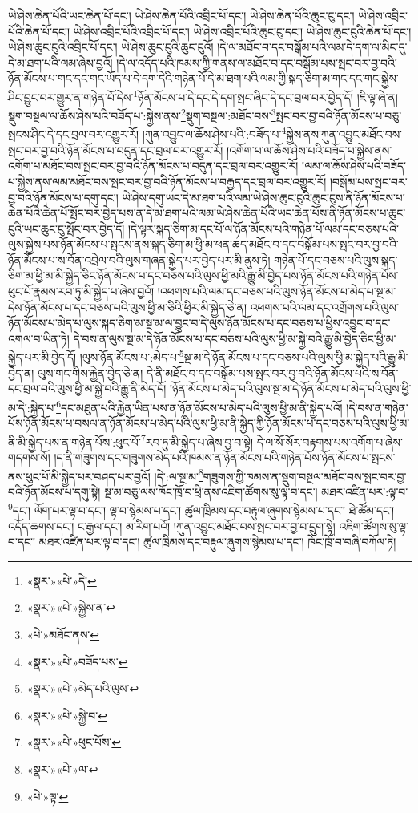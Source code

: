 ཡེ་ཤེས་ཆེན་པོའི་ཡང་ཆེན་པོ་དང་། ཡེ་ཤེས་ཆེན་པོའི་འབྲིང་པོ་དང་། ཡེ་ཤེས་ཆེན་པོའི་ཆུང་ངུ་དང་། ཡེ་ཤེས་འབྲིང་པོའི་ཆེན་པོ་དང་། ཡེ་ཤེས་འབྲིང་པོའི་འབྲིང་པོ་དང་། ཡེ་ཤེས་འབྲིང་པོའི་ཆུང་ངུ་དང་། ཡེ་ཤེས་ཆུང་ངུའི་ཆེན་པོ་དང་། ཡེ་ཤེས་ཆུང་ངུའི་འབྲིང་པོ་དང་། ཡེ་ཤེས་ཆུང་ངུའི་ཆུང་ངུའོ། །དེ་ལ་མཐོང་བ་དང་བསྒོམ་པའི་ལམ་དེ་དག་ལ་མིང་དུ་དེ་མ་ཐག་པའི་ལམ་ཞེས་བྱའོ། །དེ་ལ་འདོད་པའི་ཁམས་ཀྱི་གནས་ལ་མཐོང་བ་དང་བསྒོམ་པས་སྤང་བར་བྱ་བའི་ཉོན་མོངས་པ་གང་དང་གང་ཡོད་པ་དེ་དག་དེའི་གཉེན་པོ་དེ་མ་ཐག་པའི་ལམ་གྱི་སྐད་ཅིག་མ་གང་དང་གང་སྐྱེས་ཤིང་བྱུང་བར་གྱུར་ན་གཉེན་པོ་དེས་\footnote{«སྣར་»«པེ་»དེ་}ཉོན་མོངས་པ་དེ་དང་དེ་དག་སྤང་ཞིང་དེ་དང་བྲལ་བར་བྱེད་དོ། །ཇི་ལྟ་ཞེ་ན། སྡུག་བསྔལ་ལ་ཆོས་ཤེས་པའི་བཟོད་པ་:སྐྱེས་ནས་\footnote{«སྣར་»«པེ་»སྐྱེས་ན་}སྡུག་བསྔལ་:མཐོང་བས་\footnote{«པེ་»མཐོང་ནས་}སྤང་བར་བྱ་བའི་ཉོན་མོངས་པ་བཅུ་སྤངས་ཤིང་དེ་དང་བྲལ་བར་འགྱུར་རོ། །ཀུན་འབྱུང་ལ་ཆོས་ཤེས་པའི་:བཟོད་པ་\footnote{«སྣར་»«པེ་»བཟོད་པས་}སྐྱེས་ནས་ཀུན་འབྱུང་མཐོང་བས་སྤང་བར་བྱ་བའི་ཉོན་མོངས་པ་བདུན་དང་བྲལ་བར་འགྱུར་རོ། །འགོག་པ་ལ་ཆོས་ཤེས་པའི་བཟོད་པ་སྐྱེས་ནས་འགོག་པ་མཐོང་བས་སྤང་བར་བྱ་བའི་ཉོན་མོངས་པ་བདུན་དང་བྲལ་བར་འགྱུར་རོ། །ལམ་ལ་ཆོས་ཤེས་པའི་བཟོད་པ་སྐྱེས་ནས་ལམ་མཐོང་བས་སྤང་བར་བྱ་བའི་ཉོན་མོངས་པ་བརྒྱད་དང་བྲལ་བར་འགྱུར་རོ། །བསྒོམ་པས་སྤང་བར་བྱ་བའི་ཉོན་མོངས་པ་དགུ་དང་། ཡེ་ཤེས་དགུ་ཡང་དེ་མ་ཐག་པའི་ལམ་ཡེ་ཤེས་ཆུང་ངུའི་ཆུང་ངུས་ནི་ཉོན་མོངས་པ་ཆེན་པོའི་ཆེན་པོ་སྤོང་བར་བྱེད་པས་ན་དེ་མ་ཐག་པའི་ལམ་ཡེ་ཤེས་ཆེན་པོའི་ཡང་ཆེན་པོས་ནི་ཉོན་མོངས་པ་ཆུང་ངུའི་ཡང་ཆུང་ངུ་སྤོང་བར་བྱེད་དོ། །དེ་ལྟར་སྐད་ཅིག་མ་དང་པོ་ལ་ཉོན་མོངས་པའི་གཉེན་པོ་ལམ་དང་བཅས་པའི་ལུས་སྐྱེས་པས་ཉོན་མོངས་པ་སྤངས་ནས་སྐད་ཅིག་མ་ཕྱི་མ་ཕན་ཆད་མཐོང་བ་དང་བསྒོམ་པས་སྤང་བར་བྱ་བའི་ཉོན་མོངས་པ་ས་བོན་འབྲེལ་བའི་ལུས་གཞན་སྐྱེད་པར་བྱེད་པར་མི་ནུས་ཏེ། གཉེན་པོ་དང་བཅས་པའི་ལུས་སྐད་ཅིག་མ་ཕྱི་མ་མི་སྐྱེད་ཅིང་ཉོན་མོངས་པ་དང་བཅས་པའི་ལུས་ཕྱི་མའི་རྒྱུ་མི་བྱེད་པས་ཉོན་མོངས་པའི་གཉེན་པོས་ཕུང་པོ་རྣམས་རབ་ཏུ་མི་སྐྱེད་པ་ཞེས་བྱའོ། །འཕགས་པའི་ལམ་དང་བཅས་པའི་ལུས་ཉོན་མོངས་པ་མེད་པ་སྔ་མ་དེས་ཉོན་མོངས་པ་དང་བཅས་པའི་ལུས་ཕྱི་མ་ཅིའི་ཕྱིར་མི་སྐྱེད་ཅེ་ན། འཕགས་པའི་ལམ་དང་འགྲོགས་པའི་ལུས་ཉོན་མོངས་པ་མེད་པ་ལུས་སྐད་ཅིག་མ་སྔ་མ་ལ་བྱུང་བ་དེ་ལུས་ཉོན་མོངས་པ་དང་བཅས་པ་ཕྱིས་འབྱུང་བ་དང་འགལ་བ་ཡིན་ཏེ། དེ་བས་ན་ལུས་སྔ་མ་དེ་ཉོན་མོངས་པ་དང་བཅས་པའི་ལུས་ཕྱི་མ་སྐྱེ་བའི་རྒྱུ་མི་བྱེད་ཅིང་ཕྱི་མ་སྐྱེད་པར་མི་བྱེད་དོ། །ལུས་ཉོན་མོངས་པ་:མེད་པ་\footnote{«སྣར་»«པེ་»མེད་པའི་ལུས་}སྔ་མ་དེ་ཉོན་མོངས་པ་དང་བཅས་པའི་ལུས་ཕྱི་མ་སྐྱེད་པའི་རྒྱུ་མི་བྱེད་ན། ལུས་གང་གིས་རྐྱེན་བྱེད་ཅེ་ན། དེ་ནི་མཐོང་བ་དང་བསྒོམ་པས་སྤང་བར་བྱ་བའི་ཉོན་མོངས་པའི་ས་བོན་དང་བྲལ་བའི་ལུས་ཕྱི་མ་སྐྱེ་བའི་རྒྱུ་ནི་མེད་དོ། །ཉོན་མོངས་པ་མེད་པའི་ལུས་སྔ་མ་དེ་ཉོན་མོངས་པ་མེད་པའི་ལུས་ཕྱི་མ་དེ་:སྐྱེད་པ་\footnote{«སྣར་»«པེ་»སྐྱེ་བ་}དང་མཐུན་པའི་རྐྱེན་ཡིན་པས་ན་ཉོན་མོངས་པ་མེད་པའི་ལུས་ཕྱི་མ་ནི་སྐྱེད་པའོ། །དེ་བས་ན་གཉེན་པོས་ཉོན་མོངས་པ་བསལ་ན་ཉོན་མོངས་པ་མེད་པའི་ལུས་ཕྱི་མ་ནི་སྐྱེད་ཀྱི་ཉོན་མོངས་པ་དང་བཅས་པའི་ལུས་ཕྱི་མ་ནི་མི་སྐྱེད་པས་ན་གཉེན་པོས་:ཕུང་པོ་\footnote{«སྣར་»«པེ་»ཕུང་པོས་}རབ་ཏུ་མི་སྐྱེད་པ་ཞེས་བྱ་བ་སྟེ། དེ་ལ་སོ་སོར་བརྟགས་པས་འགོག་པ་ཞེས་གདགས་སོ། །ད་ནི་གཟུགས་དང་གཟུགས་མེད་པའི་ཁམས་ན་ཉོན་མོངས་པའི་གཉེན་པོས་ཉོན་མོངས་པ་སྤངས་ནས་ཕུང་པོ་མི་སྐྱེད་པར་བཤད་པར་བྱའོ། །དེ་:ལ་སྔ་མ་\footnote{«སྣར་»«པེ་»ལ་}གཟུགས་ཀྱི་ཁམས་ན་སྡུག་བསྔལ་མཐོང་བས་སྤང་བར་བྱ་བའི་ཉོན་མོངས་པ་དགུ་སྟེ། སྔ་མ་བཅུ་ལས་ཁོང་ཁྲོ་བ་ཕྲི་ནས་འཇིག་ཚོགས་སུ་ལྟ་བ་དང་། མཐར་འཛིན་པར་:ལྟ་བ་\footnote{«པེ་»ལྟ་}དང་། ལོག་པར་ལྟ་བ་དང་། ལྟ་བ་སྙེམས་པ་དང་། ཚུལ་ཁྲིམས་དང་བརྟུལ་ཞུགས་སྙེམས་པ་དང་། ཐེ་ཚོམ་དང་། འདོད་ཆགས་དང་། ང་རྒྱལ་དང་། མ་རིག་པའོ། །ཀུན་འབྱུང་མཐོང་བས་སྤང་བར་བྱ་བ་དྲུག་སྟེ། འཇིག་ཚོགས་སུ་ལྟ་བ་དང་། མཐར་འཛིན་པར་ལྟ་བ་དང་། ཚུལ་ཁྲིམས་དང་བརྟུལ་ཞུགས་སྙེམས་པ་དང་། ཁོང་ཁྲོ་བ་བཞི་བཀོལ་ཏེ། 